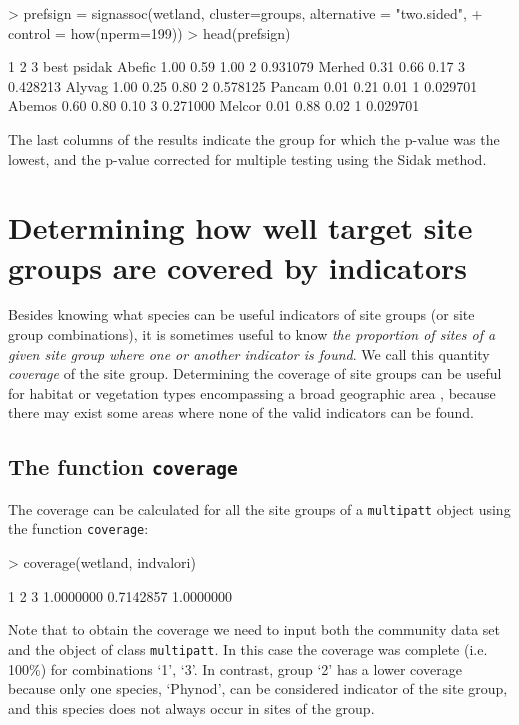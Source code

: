 \documentclass[11pt,a4paper]{article}
\begin{document}
\begin{Schunk}
\begin{Sinput}
> prefsign = signassoc(wetland, cluster=groups,  alternative = "two.sided", 
+                      control = how(nperm=199)) 
> head(prefsign)
\end{Sinput}
\begin{Soutput}
          1    2    3 best   psidak
Abefic 1.00 0.59 1.00    2 0.931079
Merhed 0.31 0.66 0.17    3 0.428213
Alyvag 1.00 0.25 0.80    2 0.578125
Pancam 0.01 0.21 0.01    1 0.029701
Abemos 0.60 0.80 0.10    3 0.271000
Melcor 0.01 0.88 0.02    1 0.029701
\end{Soutput}
\end{Schunk}
The last columns of the results indicate the group for which the p-value was the lowest, and the p-value corrected for multiple testing using the Sidak method.

\section{Determining how well target site groups are covered by indicators}
Besides knowing what species can be useful indicators of site groups (or site group combinations), it is sometimes useful to know \emph{the proportion of sites of a given site group where one or another indicator is found}. We call this quantity \emph{coverage} of the site group. Determining the coverage of site groups can be useful for habitat or vegetation types encompassing a broad geographic area \citep{DeCaceres2012}, because there may exist some areas where none of the valid indicators can be found.  
\subsection{The function \texttt{coverage}}
The coverage can be calculated for all the site groups of a \texttt{multipatt} object using the function \texttt{coverage}:
\begin{Schunk}
\begin{Sinput}
> coverage(wetland, indvalori)
\end{Sinput}
\begin{Soutput}
        1         2         3 
1.0000000 0.7142857 1.0000000 
\end{Soutput}
\end{Schunk}
Note that to obtain the coverage we need to input both the community data set and the object of class \texttt{multipatt}. In this case the coverage was complete (i.e. 100\%) for combinations `1', `3'. In contrast, group `2' has a lower coverage because only one species, `Phynod', can be considered indicator of the site group, and this species does not always occur in sites of the group. 
\end{document}

